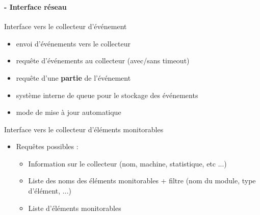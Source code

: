 \documentclass[8pt]{beamer}
\begin{document}
  \begin{frame}
  \frametitle{\secname}
  \framesubtitle{\subsecname - Interface réseau}
    \begin{block}{Interface vers le collecteur d'événement}
      \begin{itemize}
        \item envoi d'événements vers le collecteur
        \item requête d'événements au collecteur (avec/sans timeout)
        \item requête d'une \textbf{partie} de l'événement
        \item système interne de queue pour le stockage des événements
        \item mode de mise à jour automatique
      \end{itemize}
    \end{block}
    \begin{block}{Interface vers le collecteur d'éléments monitorables}
      \begin{itemize}
        \item Requêtes possibles :
        \begin{itemize}
          \item Information sur le collecteur (nom, machine, statistique, etc ...)
          \item Liste des noms des éléments monitorables + filtre (nom du module, type d'élément, ...)
          \item Liste d'éléments monitorables
        \end{itemize}
      \end{itemize}
    \end{block}
  \end{frame}
  
\end{document}

